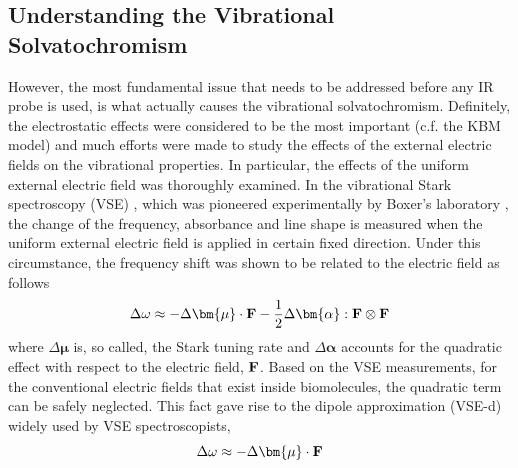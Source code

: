 \documentclass[b5paper,oneside,fleqn,11pt]{book}
\newcommand{\BM}[1]{\bm{#1}}
\begin{document}
\begin{refsection}
\section{Understanding the Vibrational Solvatochromism}
%
However, the most fundamental issue that needs to be addressed 
before any IR probe is used, is what actually causes the vibrational solvatochromism.
Definitely, the electrostatic effects were considered to be the most important
(c.f. the KBM model) and much efforts were made to study the effects of the external
electric fields on the vibrational properties. \citep{Kim.Cho.ChemRev.2013} 
In particular, the effects of the
uniform external electric field was thoroughly examined. \citep{Hush.Reimers.JPC.1995,
Reimers.Zeng.Hush.JPC.1996,Andrews.Boxer.JPCA.2002,Cho.JCP.2009} 
In the vibrational Stark spectroscopy (VSE) \citep{Hush.Reimers.JPC.1995,Reimers.Zeng.Hush.JPC.1996}, 
which was pioneered experimentally by Boxer's laboratory \citep{Bublitz.Boxer.AnnuRevPhysChem.1997}, 
the change of the frequency, absorbance
and line shape is measured when the uniform external electric field is applied in certain fixed direction.
Under this circumstance, the frequency shift
was shown to be related to the electric field as follows \citep{Hush.Reimers.JPC.1995,Reimers.Zeng.Hush.JPC.1996}
%
\begin{equation} \label{e:vse-shift-full}
 \Delta \omega \approx - \Delta {\BM \mu} \cdot {\bf F} - \frac{1}{2} \Delta {\BM \alpha} : {\bf F} \otimes {\bf F}
\end{equation}
%
where $\Delta {\BM \mu}$ is, so called, the Stark tuning rate
and $\Delta {\BM \alpha}$ accounts for the quadratic effect with respect to 
the electric field, ${\bf F}$. 
Based on the VSE measurements, for the conventional
electric fields that exist inside biomolecules, the quadratic term
can be safely neglected. 
This fact gave rise to the dipole approximation (VSE-d)
widely used by VSE spectroscopists,
%
\begin{equation} \label{e:vse-shift-dipole}
 \Delta \omega \approx - \Delta {\BM \mu} \cdot {\bf F}

\end{equation}
\end{refsection}
\end{document}
